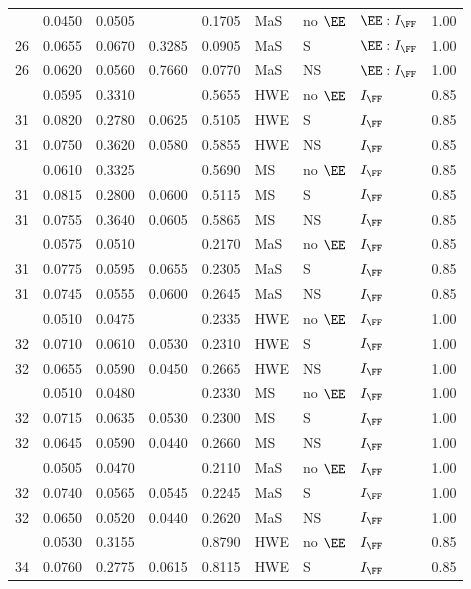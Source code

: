 \begin{longtable}[t]{lllllllll}
\addlinespace
26 & 0.0450 & 0.0505 &  & 0.1705 & MaS & no $\EE$ & $\EE:I_{\FF}$ & 1.00\\
26 & 0.0655 & 0.0670 & 0.3285 & 0.0905 & MaS & S & $\EE:I_{\FF}$ & 1.00\\
26 & 0.0620 & 0.0560 & 0.7660 & 0.0770 & MaS & NS & $\EE:I_{\FF}$ & 1.00\\
\addlinespace
31 & 0.0595 & 0.3310 &  & 0.5655 & HWE & no $\EE$ & $I_{\FF}$ & 0.85\\
31 & 0.0820 & 0.2780 & 0.0625 & 0.5105 & HWE & S & $I_{\FF}$ & 0.85\\
31 & 0.0750 & 0.3620 & 0.0580 & 0.5855 & HWE & NS & $I_{\FF}$ & 0.85\\
\addlinespace
31 & 0.0610 & 0.3325 &  & 0.5690 & MS & no $\EE$ & $I_{\FF}$ & 0.85\\
31 & 0.0815 & 0.2800 & 0.0600 & 0.5115 & MS & S & $I_{\FF}$ & 0.85\\
31 & 0.0755 & 0.3640 & 0.0605 & 0.5865 & MS & NS & $I_{\FF}$ & 0.85\\
\addlinespace
31 & 0.0575 & 0.0510 &  & 0.2170 & MaS & no $\EE$ & $I_{\FF}$ & 0.85\\
31 & 0.0775 & 0.0595 & 0.0655 & 0.2305 & MaS & S & $I_{\FF}$ & 0.85\\
31 & 0.0745 & 0.0555 & 0.0600 & 0.2645 & MaS & NS & $I_{\FF}$ & 0.85\\
\addlinespace
32 & 0.0510 & 0.0475 &  & 0.2335 & HWE & no $\EE$ & $I_{\FF}$ & 1.00\\
32 & 0.0710 & 0.0610 & 0.0530 & 0.2310 & HWE & S & $I_{\FF}$ & 1.00\\
32 & 0.0655 & 0.0590 & 0.0450 & 0.2665 & HWE & NS & $I_{\FF}$ & 1.00\\
\addlinespace
32 & 0.0510 & 0.0480 &  & 0.2330 & MS & no $\EE$ & $I_{\FF}$ & 1.00\\
32 & 0.0715 & 0.0635 & 0.0530 & 0.2300 & MS & S & $I_{\FF}$ & 1.00\\
32 & 0.0645 & 0.0590 & 0.0440 & 0.2660 & MS & NS & $I_{\FF}$ & 1.00\\
\addlinespace
32 & 0.0505 & 0.0470 &  & 0.2110 & MaS & no $\EE$ & $I_{\FF}$ & 1.00\\
32 & 0.0740 & 0.0565 & 0.0545 & 0.2245 & MaS & S & $I_{\FF}$ & 1.00\\
32 & 0.0650 & 0.0520 & 0.0440 & 0.2620 & MaS & NS & $I_{\FF}$ & 1.00\\
\addlinespace
34 & 0.0530 & 0.3155 &  & 0.8790 & HWE & no $\EE$ & $I_{\FF}$ & 0.85\\
34 & 0.0760 & 0.2775 & 0.0615 & 0.8115 & HWE & S & $I_{\FF}$ & 0.85\\

\end{longtable}
